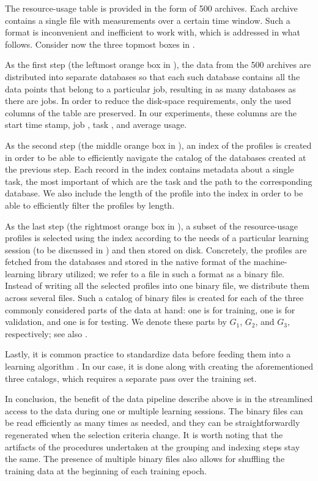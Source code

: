 The resource-usage table is provided in the form of 500 archives. Each archive
contains a single file with measurements over a certain time window. Such a
format is inconvenient and inefficient to work with, which is addressed in what
follows. Consider now the three topmost boxes in .

As the first step (the leftmost orange box in ), the data
from the 500 archives are distributed into separate databases so that each such
database contains all the data points that belong to a particular job, resulting
in as many databases as there are jobs. In order to reduce the disk-space
requirements, only the used columns of the table are preserved. In our
experiments, these columns are the start time stamp, job , task ,
and average  usage.

As the second step (the middle orange box in ), an index of
the profiles is created in order to be able to efficiently navigate the catalog
of the databases created at the previous step. Each record in the index contains
metadata about a single task, the most important of which are the task 
and the path to the corresponding database. We also include the length of the
profile into the index in order to be able to efficiently filter the profiles by
length.

As the last step (the rightmost orange box in ), a subset
of the resource-usage profiles is selected using the index according to the
needs of a particular learning session (to be discussed in )
and then stored on disk. Concretely, the profiles are fetched from the databases
and stored in the native format of the machine-learning library utilized; we
refer to a file in such a format as a binary file. Instead of writing all the
selected profiles into one binary file, we distribute them across several files.
Such a catalog of binary files is created for each of the three commonly
considered parts \cite{hastie2013} of the data at hand: one is for training, one
is for validation, and one is for testing. We denote these parts by $G_1$,
$G_2$, and $G_3$, respectively; see also .

Lastly, it is common practice to standardize data before feeding them into a
learning algorithm \cite{hastie2013}. In our case, it is done along with
creating the aforementioned three catalogs, which requires a separate pass over
the training set.

In conclusion, the benefit of the data pipeline describe above is in the
streamlined access to the data during one or multiple learning sessions. The
binary files can be read efficiently as many times as needed, and they can be
straightforwardly regenerated when the selection criteria change. It is worth
noting that the artifacts of the procedures undertaken at the grouping and
indexing steps stay the same. The presence of multiple binary files also allows
for shuffling the training data at the beginning of each training epoch.

